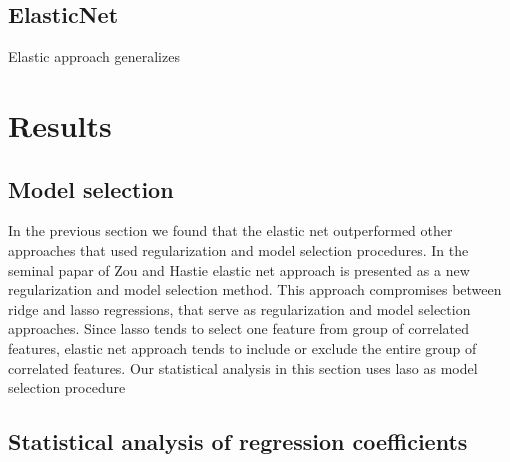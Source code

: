 \documentclass{article}
\begin{document}
\subsection{ElasticNet}

Elastic approach generalizes 
\section{Results}

\subsection{Model selection}
In the  previous section we found that the elastic net outperformed other approaches that used regularization and model selection procedures. In the seminal papar of Zou and Hastie elastic net approach is presented as  a new regularization and model selection method. This approach compromises between ridge and lasso regressions, that serve as regularization and model selection approaches. Since lasso tends to select one feature from group of correlated features, elastic net approach tends to include or exclude the entire group of correlated features. Our statistical analysis in this section uses laso as model selection procedure 


\newpage
\subsection{Statistical analysis of regression coefficients}


\end{document}
